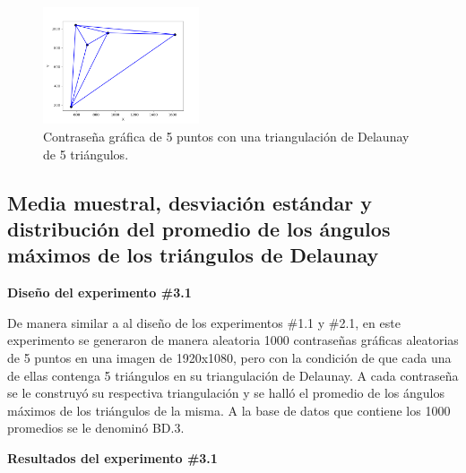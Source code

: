 \documentclass[12pt]{report}
\begin{document}
\begin{figure}[ht]
	\centering
	
	\includegraphics[width=0.41\textwidth]{alea5td.png}
	\caption{Contraseña gráfica de 5 puntos con una triangulación de Delaunay de 5 triángulos.}
	\label{5TD}
\end{figure}

\subsection{Media muestral, desviación estándar y distribución del promedio de los ángulos máximos de los triángulos de Delaunay}
\label{sec:3.1}

\textbf{ Diseño del experimento \#3.1}

De manera similar a al diseño de los experimentos \#1.1 y \#2.1, en este experimento se generaron de manera aleatoria 1000 contraseñas gráficas aleatorias de 5 puntos en una imagen de 1920x1080, pero con la condición de que cada una de ellas contenga 5 triángulos en su triangulación de Delaunay. A cada contraseña se le construyó su respectiva triangulación y se halló el promedio de los ángulos máximos de los triángulos de la misma. A la base de datos que contiene los 1000 promedios se le denominó BD.3.



\textbf{Resultados del experimento \#3.1}
\end{document}
